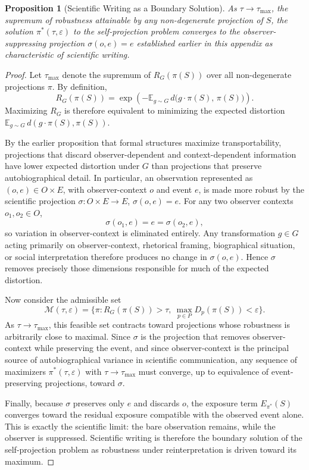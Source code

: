 \documentclass[11pt]{article}
\theoremstyle{plain}
\newtheorem{proposition}{Proposition}[section]
\begin{document}
\begin{proposition}[Scientific Writing as a Boundary Solution]
As $\tau \to \tau_{\max}$, the supremum of robustness attainable by any non-degenerate projection of $S$, the solution $\pi^\ast(\tau,\varepsilon)$ to the self-projection problem converges to the observer-suppressing projection $\sigma(o,e) = e$ established earlier in this appendix as characteristic of scientific writing.
\end{proposition}
\begin{proof}
Let $\tau_{\max}$ denote the supremum of $R_G(\pi(S))$ over all non-degenerate projections $\pi$. By definition,
\[
R_G(\pi(S)) = \exp\!\left(-\mathbb{E}_{g\sim G}\, d\big(g\cdot \pi(S),\, \pi(S)\big)\right).
\]
Maximizing $R_G$ is therefore equivalent to minimizing the expected distortion $\mathbb{E}_{g\sim G}\, d(g\cdot \pi(S), \pi(S))$.

By the earlier proposition that formal structures maximize transportability, projections that discard observer-dependent and context-dependent information have lower expected distortion under $G$ than projections that preserve autobiographical detail. In particular, an observation represented as $(o,e) \in O \times E$, with observer-context $o$ and event $e$, is made more robust by the scientific projection $\sigma : O \times E \to E$, $\sigma(o,e) = e$. For any two observer contexts $o_1, o_2 \in O$,
\[
\sigma(o_1,e) = e = \sigma(o_2,e),
\]
so variation in observer-context is eliminated entirely. Any transformation $g \in G$ acting primarily on observer-context, rhetorical framing, biographical situation, or social interpretation therefore produces no change in $\sigma(o,e)$. Hence $\sigma$ removes precisely those dimensions responsible for much of the expected distortion.

Now consider the admissible set
\[
\mathcal{M}(\tau,\varepsilon) = \Big\{\pi : R_G(\pi(S)) > \tau,\ \max_{p\in P} D_p(\pi(S)) < \varepsilon\Big\}.
\]
As $\tau \to \tau_{\max}$, this feasible set contracts toward projections whose robustness is arbitrarily close to maximal. Since $\sigma$ is the projection that removes observer-context while preserving the event, and since observer-context is the principal source of autobiographical variance in scientific communication, any sequence of maximizers $\pi^\ast(\tau,\varepsilon)$ with $\tau \to \tau_{\max}$ must converge, up to equivalence of event-preserving projections, toward $\sigma$.

Finally, because $\sigma$ preserves only $e$ and discards $o$, the exposure term $E_{\pi^\ast}(S)$ converges toward the residual exposure compatible with the observed event alone. This is exactly the scientific limit: the bare observation remains, while the observer is suppressed. Scientific writing is therefore the boundary solution of the self-projection problem as robustness under reinterpretation is driven toward its maximum.
\end{proof}
\end{document}
